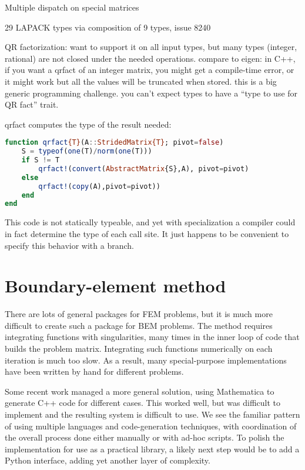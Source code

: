 Multiple dispatch on special matrices

29 LAPACK types via composition of 9 types, issue 8240

QR factorization: want to support it on all input types, but many
types (integer, rational) are not closed under the needed operations.
compare to eigen: in C++, if you want a qrfact of an integer matrix,
you might get a compile-time error, or it might work but all the values
will be truncated when stored. this is a big generic programming
challenge. you can't expect types to have a ``type to use for QR fact''
trait.

qrfact computes the type of the result needed:

\begin{singlespace}
\begin{lstlisting}[language=julia]
function qrfact{T}(A::StridedMatrix{T}; pivot=false)
    S = typeof(one(T)/norm(one(T)))
    if S != T
        qrfact!(convert(AbstractMatrix{S},A), pivot=pivot)
    else
        qrfact!(copy(A),pivot=pivot))
    end
end
\end{lstlisting}
\end{singlespace}

This code is not statically typeable, and yet with specialization a
compiler could in fact determine the type of each call site.
It just happens to be convenient to specify this behavior with a
branch.


\section{Boundary-element method}
\label{sec:BEM}

There are lots of general packages for FEM problems, but it is much more
difficult to create such a package for BEM problems. The method requires
integrating functions with singularities, many times in the inner loop
of code that builds the problem matrix. Integrating such functions
numerically on each iteration is much too slow. As a result, many
special-purpose implementations have been written by hand for different
problems.

Some recent work \cite{ReidWhJo14} managed a more general solution,
using Mathematica to generate C++ code for different cases. This worked
well, but was difficult to implement and the resulting system is difficult
to use. We see the familiar pattern of using multiple languages and
code-generation techniques, with coordination of the overall process done
either manually or with ad-hoc scripts. To polish the implementation for
use as a practical library, a likely next step would be to add a Python
interface, adding yet another layer of complexity.

